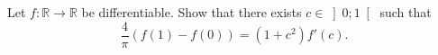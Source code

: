 \begin{problem}
    Let \( f \colon \mathbb{R} \longrightarrow \mathbb{R} \) be differentiable. Show that there exists \( c \in \left]0;1\right[ \) such that
    \[
        \frac{4}{\pi}\left(f\left(1\right)-f\left(0\right)\right) = \left(1+c^2\right)f'\left(c\right).
    \]
\end{problem}
